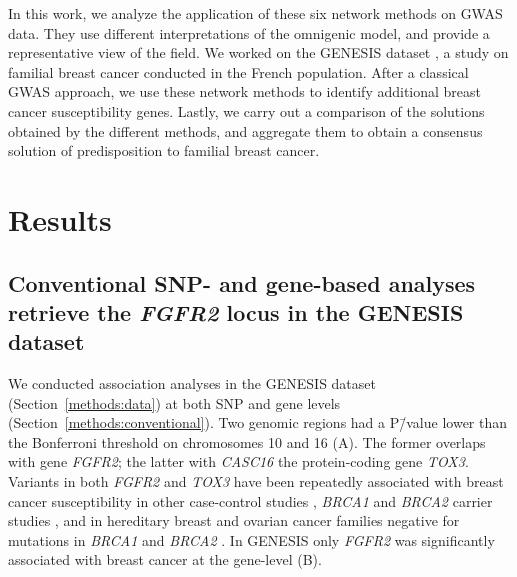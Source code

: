 \documentclass[10pt,letterpaper]{article}
\begin{document}
In this work, we analyze the application of these six network methods on GWAS data. They use different interpretations of the omnigenic model, and provide a representative view of the field. We worked on the GENESIS dataset \cite{sinilnikova_genesis:_2016}, a study on familial breast cancer conducted in the French population. After a classical GWAS approach, we use these network methods to identify additional breast cancer susceptibility genes. Lastly, we carry out a comparison of the solutions obtained by the different methods, and aggregate them to obtain a consensus solution of predisposition to familial breast cancer. 

\section{Results}

\subsection{Conventional SNP- and gene-based analyses retrieve the \emph{FGFR2} locus in the GENESIS dataset}
\label{results:conventional}

We conducted association analyses in the GENESIS dataset (Section~\ref{methods:data}) at both SNP and gene levels (Section~\ref{methods:conventional}). Two genomic regions had a P\=/value lower than the Bonferroni threshold on chromosomes 10 and 16 (A). The former overlaps with gene \emph{FGFR2}; the latter with \emph{CASC16} the protein-coding gene \emph{TOX3}. Variants in both \emph{FGFR2} and \emph{TOX3} have been repeatedly associated with breast cancer susceptibility in other case-control studies \cite{Michailidou2017}, \emph{BRCA1} and \emph{BRCA2} carrier studies \cite{Mulligan2011}, and in hereditary breast and ovarian cancer families negative for mutations in \emph{BRCA1} and \emph{BRCA2} \cite{rinella_genetic_2013}. In GENESIS only \emph{FGFR2} was significantly associated with breast cancer at the gene-level (B).
\end{document}
